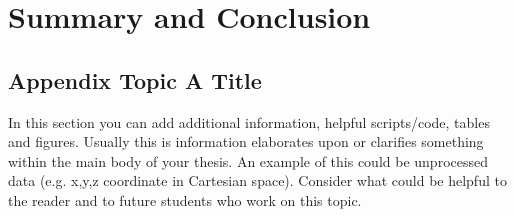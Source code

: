 \documentclass[a4paper]{book}
\begin{document}
\chapter{Summary and Conclusion}
\cite{Gee20}
\cite{Rap20}
\cite{Piral}
\cite{Zalando}
\cite{Webpack}
\cite{Lew14}
\cite{Ben19}
\cite{Zha18}
\cite{Mez21}

\clearpage
{}


%


% 

% 


\clearpage
{}

\begin{appendix}
\chapter{Appendix Topic A Title}
In this section you can add additional information, helpful scripts/code, tables and figures. Usually this is information elaborates upon or clarifies something within the main body of your thesis. An example of this could be unprocessed data (e.g. x,y,z coordinate in Cartesian space). Consider what could be helpful to the reader and to future students who work on this topic.


\end{appendix}

\end{document}
